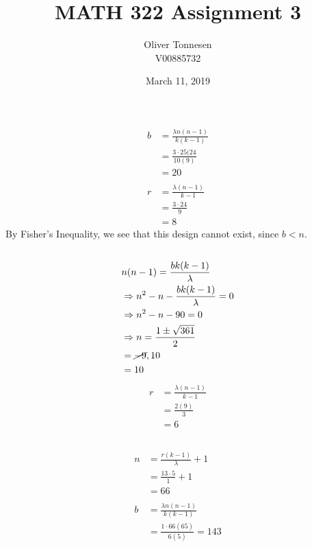 \documentclass{article}
\title{MATH 322 Assignment 3}
\author{Oliver Tonnesen\\V00885732}
\date{March 11, 2019}
\begin{document}
\maketitle
\renewcommand{\thesubsection}{\thesection.\roman{subsection}}
\section{} %
\subsection{} %
\begin{align*}
	b&=\frac{\lambda n(n-1)}{k(k-1)}\\
	&=\frac{3\cdot25(24}{10(9)}\\
	&=20\\\\
	r&=\frac{\lambda(n-1)}{k-1}\\
	&=\frac{3\cdot24}{9}\\
	&=8
\end{align*}
By Fisher's Inequality, we see that this design cannot exist, since $b<n$.
\subsection{} %
\begin{align*}
	&n(n-1)=\frac{bk(k-1)}{\lambda}\\
	&\Rightarrow n^2-n-\frac{bk(k-1)}{\lambda}=0\\
	&\Rightarrow n^2-n-90=0\\
	&\Rightarrow n = \frac{1\pm\sqrt{361}}{2}\\
	&= \cancel{-9}, 10\\
	&= 10\\
\end{align*}
\begin{align*}
	r&=\frac{\lambda(n-1)}{k-1}\\
	&=\frac{2(9)}{3}\\
	&=6
\end{align*}
\subsection{} %
\begin{align*}
	n&=\frac{r(k-1)}{\lambda}+1\\
	&=\frac{13\cdot5}{1}+1\\
	&=66\\\\
	b&=\frac{\lambda n(n-1)}{k(k-1)}\\
	&=\frac{1\cdot66(65)}{6(5)}=143
\end{align*}
\end{document}
